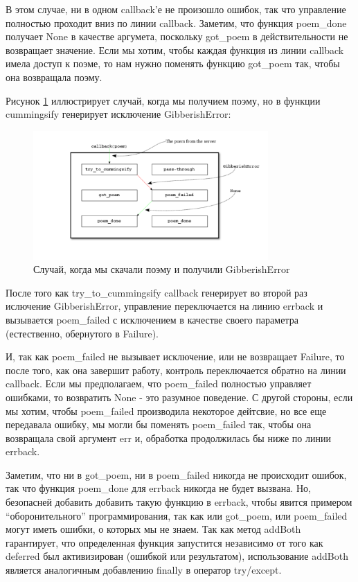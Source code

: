В этом случае, ни в одном callback'е не произошло ошибок, так что 
управление полностью проходит вниз по линии callback. Заметим, что 
функция poem\_done получает None в качестве аргумета, поскольку 
got\_poem в действительности не возвращает значение. 
Если мы хотим, чтобы каждая функция из линии callback 
имела доступ к поэме, то нам нужно поменять функцию got\_poem так, 
чтобы она возвращала поэму.


Рисунок \ref{fig:deferred-6} иллюстрирует случай, когда мы получием поэму, но 
в функции cummingsify генерирует исключение GibberishError:

\begin{figure}[h]
\begin{center}
    \includegraphics[width=0.8\textwidth]{images/deferred-6.pdf}
    \caption{Случай, когда мы скачали поэму и получили GibberishError\label{fig:deferred-6}}
\end{center}
\end{figure}


После того как try\_to\_cummingsify callback генерирует во второй раз 
ислючение GibberishError, управление переключается на линию errback и 
вызывается poem\_failed с исключением в качестве своего параметра (естественно, 
обернутого в Failure).


И, так как poem\_failed не вызывает исключение, или не возвращает Failure, 
то после того, как она завершит работу, контроль переключается обратно на линии 
callback. Если мы предполагаем, что poem\_failed полностью управляет ошибками, 
то возвратить None - это разумное поведение. С другой стороны, если мы хотим, чтобы 
poem\_failed производила некоторое дейтсвие, но все еще передавала ошибку, мы 
могли бы поменять poem\_failed так, чтобы она возвращала свой аргумент err и, 
обработка продолжилась бы ниже по линии errback. 


Заметим, что ни в got\_poem, ни в poem\_failed никогда не 
происходит ошибок, так что функция poem\_done для errback никогда не 
будет вызвана. Но, безопасней добавить добавить такую функцию в errback, 
чтобы явится примером ``оборонительного'' программирования, 
так как или got\_poem, или poem\_failed могут иметь ошибки, 
о которых мы не знаем. Так как метод addBoth гарантирует, что 
определенная функция запустится независимо от того как 
deferred был активизирован (ошибкой или результатом), использование addBoth  
является аналогичным добавлению finally в оператор try/except. 


